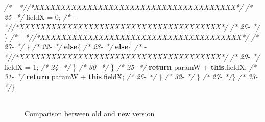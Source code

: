 \documentclass[
]{article}
\newenvironment{Shaded}{\begin{snugshade}}{\end{snugshade}}
\newcommand{\CommentTok}[1]{\textcolor[rgb]{0.56,0.35,0.01}{\textit{#1}}}
\newcommand{\DecValTok}[1]{\textcolor[rgb]{0.00,0.00,0.81}{#1}}
\newcommand{\FunctionTok}[1]{\textcolor[rgb]{0.00,0.00,0.00}{#1}}
\newcommand{\KeywordTok}[1]{\textcolor[rgb]{0.13,0.29,0.53}{\textbf{#1}}}
\newcommand{\NormalTok}[1]{#1}
\begin{document}
\begin{landscape}
\begin{Shaded}
\begin{Highlighting}[]
\CommentTok{/*   -                 *//*XXXXXXXXXXXXXXXXXXXXXXXXXXXXXXXXXXXXXX*/}                     \CommentTok{/* 25-                 */}\NormalTok{                fieldX = }\DecValTok{0}\NormalTok{;                                    }
\CommentTok{/*   -                 *//*XXXXXXXXXXXXXXXXXXXXXXXXXXXXXXXXXXXXXX*/}                     \CommentTok{/* 26-                 */}\NormalTok{            \}                                                  }
\CommentTok{/*   -                 *//*XXXXXXXXXXXXXXXXXXXXXXXXXXXXXXXXXXXXXX*/}                     \CommentTok{/* 27-                 */}\NormalTok{        \}                                                      }
\CommentTok{/* 22-                 */}        \KeywordTok{else}\NormalTok{\{                                                  }\CommentTok{/* 28-                 */}        \KeywordTok{else}\NormalTok{\{                                                  }
\CommentTok{/*   -                 *//*XXXXXXXXXXXXXXXXXXXXXXXXXXXXXXXXXXXXXX*/}                     \CommentTok{/* 29-                 */}\NormalTok{            fieldX = }\DecValTok{1}\NormalTok{;                                        }
\CommentTok{/* 24-                 */}\NormalTok{        \}                                                      }\CommentTok{/* 30-                 */}\NormalTok{        \}                                                      }
\CommentTok{/* 25-                 */}        \KeywordTok{return}\NormalTok{ paramW + }\KeywordTok{this}\NormalTok{.}\FunctionTok{fieldX}\NormalTok{;                           }\CommentTok{/* 31-                 */}        \KeywordTok{return}\NormalTok{ paramW + }\KeywordTok{this}\NormalTok{.}\FunctionTok{fieldX}\NormalTok{;                           }
\CommentTok{/* 26-                 */}\NormalTok{     \}                                                         }\CommentTok{/* 32-                 */}\NormalTok{     \}                                                         }
\CommentTok{/* 27-                 */}\NormalTok{\}                                                              }\CommentTok{/* 33-                 */}\NormalTok{\}                                                              }
\end{Highlighting}
\end{Shaded}

\normalsize

\begin{figure}
\centering
\includegraphics{figures/fake.png}
\caption{Comparison between old and new version
\label{comparison_nested_in_other_if}}
\end{figure}

\end{landscape}
\end{document}
